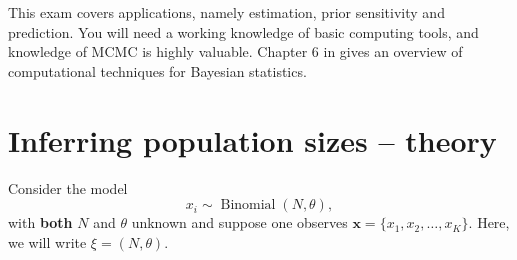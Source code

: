 \documentclass[a4paper,10pt, notitlepage]{report}
\begin{document}
This exam covers applications, namely estimation, prior sensitivity and prediction.
You will need a working knowledge of basic computing tools, and knowledge of MCMC is highly valuable.
Chapter 6 in \cite{Robert2007} gives an overview of computational techniques for Bayesian statistics.

\section*{Inferring population sizes -- theory}

Consider the model
\begin{equation*}
 x_i \sim \operatorname{Binomial}(N, \theta),
\end{equation*}
with \textbf{both} $N$ and $\theta$ unknown and suppose one observes $\boldsymbol{x} = \{x_1, x_2, \ldots, x_K\}$.
Here, we will write $\xi = (N, \theta)$.
\end{document}
